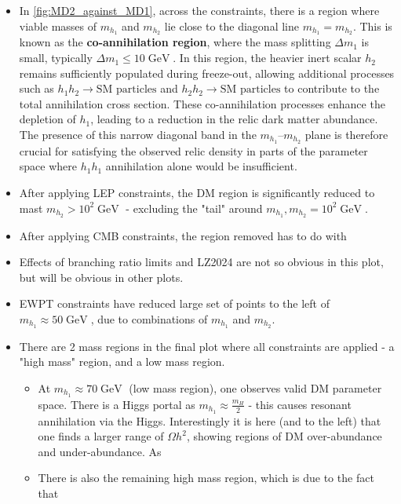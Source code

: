 \documentclass[12pt]{article}
\newcommand{\gev}{\mathrel{\text{ GeV}}}
\newcommand{\mhone}{m_{h_1}}
\newcommand{\mhtwo}{m_{h_2}}
\begin{document}
\begin{itemize}
    \item In \ref{fig:MD2_against_MD1}, across the constraints, there is a region where viable masses of $\mhone$ and $\mhtwo$ lie close to the diagonal line $\mhone = \mhtwo$. This is known as the \textbf{co-annihilation region}, where the mass splitting $\Delta m_1 $ is small, typically $\Delta m_1 \leq 10 \gev$. In this region, the heavier inert scalar $h_2$ remains sufficiently populated during freeze-out, allowing additional processes such as $h_1 h_2 \rightarrow \text{SM particles}$ and $h_2 h_2 \rightarrow \text{SM particles}$ to contribute to the total annihilation cross section. These co-annihilation processes enhance the depletion of $h_1$, leading to a reduction in the relic dark matter abundance. The presence of this narrow diagonal band in the $m_{h_1}$–$m_{h_2}$ plane is therefore crucial for satisfying the observed relic density in parts of the parameter space where $h_1 h_1$ annihilation alone would be insufficient.
    \item After applying LEP constraints, the DM region is significantly reduced to mast $\mhtwo > 10^2 \gev$ - excluding the "tail" around $\mhone ,\mhtwo = 10^2 \gev$. 
    \item After applying CMB constraints, the region removed has to do with 
    \item Effects of branching ratio limits and LZ2024 are not so obvious in this plot, but will be obvious in other plots.
    \item EWPT constraints have reduced large set of points to the left of $\mhone \approx50 \gev$, due to combinations of $\mhone$ and $\mhtwo$.
    \item There are 2 mass regions in the final plot where all constraints are applied - a "high mass" region, and a low mass region.
    \begin{itemize}
            \item At $\mhone \approx 70 \gev$ (low mass region), one observes valid DM parameter space. There is a Higgs portal as $\mhone \approx \frac{m_H}{2}$ - this causes resonant annihilation via the Higgs. Interestingly it is here (and to the left) that one finds a larger range of $\Omega h^2$, showing regions of DM over-abundance and under-abundance. As 
    \item There is also the remaining high mass region, which is due to the fact that 
    \end{itemize}
\end{itemize}
\end{document}
